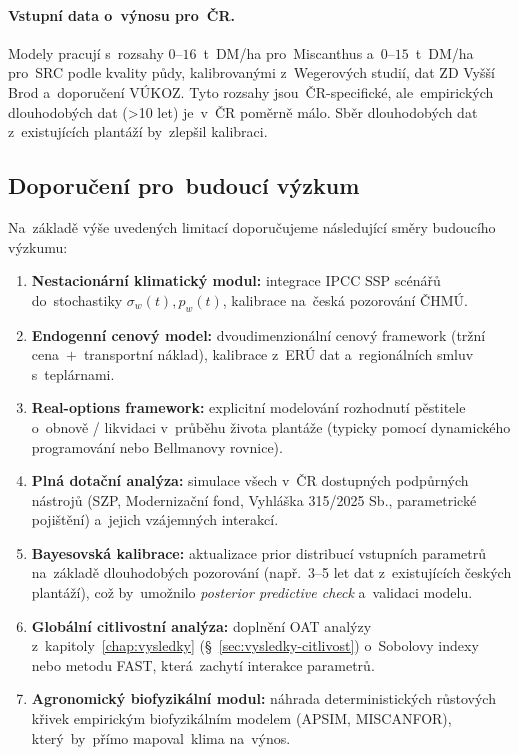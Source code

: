 \paragraph{Vstupní data o~výnosu pro~ČR.}
Modely pracují s~rozsahy $0$--$16$~t~DM/ha pro~Miscanthus a~$0$--$15$~t~DM/ha
pro~SRC podle kvality půdy, kalibrovanými z~Wegerových studií, dat
ZD Vyšší Brod a~doporučení VÚKOZ. Tyto rozsahy jsou~ČR-specifické,
ale~empirických dlouhodobých dat (>10 let) je~v~ČR poměrně málo.
Sběr dlouhodobých dat z~existujících plantáží by~zlepšil kalibraci.

\subsection{Doporučení pro~budoucí výzkum}
\label{subsec:budouci-vyzkum}

Na~základě výše uvedených limitací doporučujeme následující směry
budoucího výzkumu:
\begin{enumerate}
\item \textbf{Nestacionární klimatický modul:} integrace IPCC SSP scénářů
      do~stochastiky $\sigma_w(t), p_w(t)$, kalibrace na~česká pozorování
      ČHMÚ.
\item \textbf{Endogenní cenový model:} dvoudimenzionální cenový
      framework (tržní cena~$+$~transportní náklad), kalibrace z~ERÚ dat
      a~regionálních smluv s~teplárnami.
\item \textbf{Real-options framework:} explicitní modelování
      rozhodnutí pěstitele o~obnově / likvidaci v~průběhu života
      plantáže (typicky pomocí dynamického programování nebo Bellmanovy
      rovnice).
\item \textbf{Plná dotační analýza:} simulace všech v~ČR dostupných
      podpůrných nástrojů (SZP, Modernizační fond, Vyhláška 315/2025
      Sb., parametrické pojištění) a~jejich vzájemných interakcí.
\item \textbf{Bayesovská kalibrace:} aktualizace prior distribucí
      vstupních parametrů na~základě dlouhodobých pozorování (např.~3--5
      let dat z~existujících českých plantáží), což by~umožnilo
      \emph{posterior predictive check} a~validaci modelu.
\item \textbf{Globální citlivostní analýza:} doplnění OAT analýzy
      z~kapitoly~\ref{chap:vysledky} (\S~\ref{sec:vysledky-citlivost})
      o~Sobolovy indexy nebo metodu FAST, která~zachytí interakce parametrů.
\item \textbf{Agronomický biofyzikální modul:} náhrada deterministických
      růstových křivek empirickým biofyzikálním modelem (APSIM, MISCANFOR),
      který~by~přímo mapoval~klima na~výnos.
\end{enumerate}

